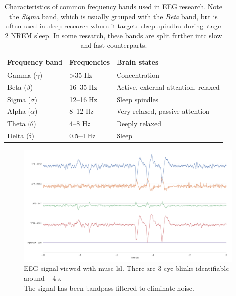     \begin{table}
        \centering
        \begin{tabular}{lll}
            \toprule
            Frequency band & Frequencies & Brain states \\
            \midrule
            Gamma ($\gamma$) & >35 Hz & Concentration \\
            Beta ($\beta$) & 16--35 Hz & Active, external attention, relaxed \\
            Sigma ($\sigma$) & 12--16 Hz & Sleep spindles \\
            Alpha ($\alpha$) & 8--12 Hz & Very relaxed, passive attention \\
            Theta ($\theta$) & 4--8 Hz & Deeply relaxed \\
            Delta ($\delta$) & 0.5--4 Hz & Sleep \\
            \bottomrule
        \end{tabular}
        \caption{Characteristics of common frequency bands used in EEG research. Note the \emph{Sigma} band, which is usually grouped with the \emph{Beta} band, but is often used in sleep research where it targets sleep spindles during stage 2 NREM sleep. In some research, these bands are split further into slow and fast counterparts.}\label{table:freq-bands}
    \end{table}



    \begin{landscape}
        \begin{figure}
            \begin{center}
                \includegraphics[trim=60 50 50 60,clip,width=22cm]{img/muselsl-signal.png}
            \end{center}
            \caption{EEG signal viewed with muse-lsl. There are 3 eye blinks identifiable around $\SI{-4}{\second}$.\\ The signal has been bandpass filtered to eliminate noise.}\label{fig:muselsl-signal}
        \end{figure}
    \end{landscape}

